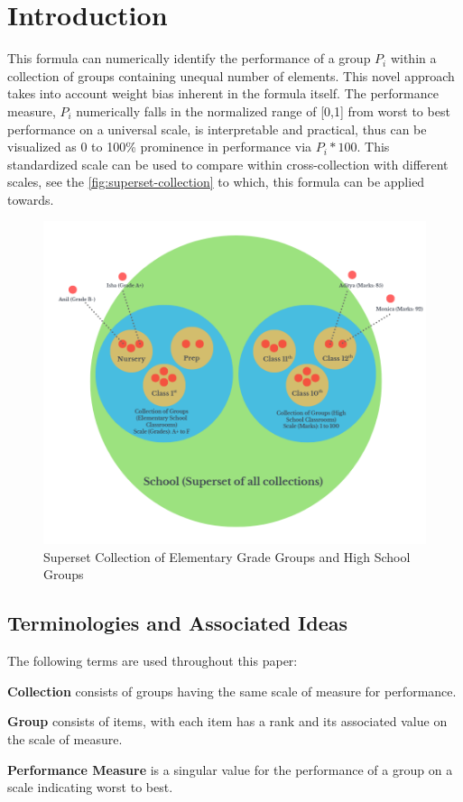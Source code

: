 \documentclass[a4paper,fleqn,review]{cas-sc}
\begin{document}
\section{Introduction}
This formula can numerically identify the performance of a group $P_i$ within a collection of groups containing unequal number of elements. This novel approach takes into account weight bias inherent in the formula itself. The performance measure, $P_i$ numerically falls in the normalized range of [0,1] from worst to best performance on a universal scale, is interpretable and practical, thus can be visualized as 0 to 100\% prominence in performance via $P_i * 100$. 
This standardized scale can be used to compare within cross-collection with different scales, see the \autoref{fig:superset-collection} to which, this formula can be applied towards.
\begin{figure}
	\centering   
    \includegraphics [scale=0.5]{superset_collection.png}
    \caption{Superset Collection of Elementary Grade Groups and High School Groups}
    \label{fig:superset-collection}
\end{figure}

\subsection{Terminologies and Associated Ideas}
The following terms are used throughout this paper:
\begin{definition}
	\textbf{Collection} consists of groups having the same scale of measure for performance.
\end{definition}
\begin{definition}
	\textbf{Group} consists of items, with each item has a rank and its associated value on the scale of measure.
\end{definition}
\begin{definition}
	\textbf{Performance Measure} is a singular value for the performance of a group on a scale indicating worst to best.
\end{definition}
\end{document}
